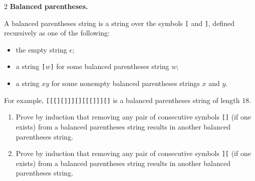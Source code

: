 \documentclass[12pt]{article}
\begin{document}
\begin{problem}{2}
    \textbf{Balanced parentheses.}  

    A balanced parentheses string is a string over the symbols \texttt{[} and \texttt{]},
    defined recursively as one of the following:
    \begin{itemize}
        \item the empty string $\epsilon$;
        \item a string \texttt{[}$w$\texttt{]} for some balanced parentheses string $w$;
        \item a string $xy$ for some nonempty balanced parentheses strings $x$ and $y$.
    \end{itemize}

    For example, \texttt{[[[][]]][][[[]]][]} is a balanced parentheses string of length $18$.

    \begin{enumerate}
        \item Prove by induction that removing any pair of consecutive symbols \texttt{[]} (if one
        exists) from a balanced parentheses string results in another balanced parentheses string.

        \item[$\star$ 2.]
        Prove by induction that removing any pair of consecutive symbols \texttt{][} (if one exists)
        from a balanced parentheses string results in another balanced parentheses string.
        \end{enumerate}
\end{problem}
\end{document}

